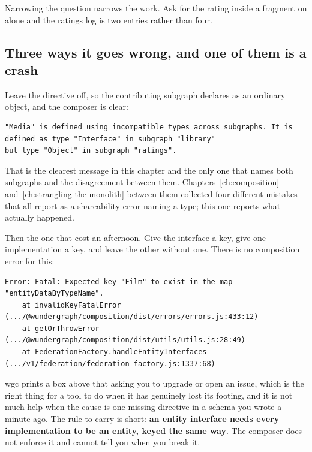 Narrowing the question narrows the work. Ask for the rating inside a fragment on
 alone and the ratings log is two entries rather than four.

\subsection*{Three ways it goes wrong, and one of them is a crash}

%
Leave the directive off, so the contributing subgraph declares  as an
ordinary object, and the composer is clear:

\begin{verbatim}
"Media" is defined using incompatible types across subgraphs. It is defined as type "Interface" in subgraph "library"
but type "Object" in subgraph "ratings".
\end{verbatim}

That is the clearest message in this chapter and the only one that names both
subgraphs and the disagreement between them. Chapters~\ref{ch:composition}
and~\ref{ch:strangling-the-monolith} between them collected four different
mistakes that all report as a shareability error naming a type; this one reports
what actually happened.

%
Then the one that cost an afternoon. Give the interface a key, give one
implementation a key, and leave the other without one. There is no composition
error for this:

\begin{verbatim}
Error: Fatal: Expected key "Film" to exist in the map "entityDataByTypeName".
    at invalidKeyFatalError (.../@wundergraph/composition/dist/errors/errors.js:433:12)
    at getOrThrowError (.../@wundergraph/composition/dist/utils/utils.js:28:49)
    at FederationFactory.handleEntityInterfaces (.../v1/federation/federation-factory.js:1337:68)
\end{verbatim}

wgc prints a box above that asking you to upgrade or open an issue, which is the
right thing for a tool to do when it has genuinely lost its footing, and it is
not much help when the cause is one missing directive in a schema you wrote a
minute ago. The rule to carry is short: \textbf{an entity interface needs every
implementation to be an entity, keyed the same way}. The composer does not
enforce it and cannot tell you when you break it.


